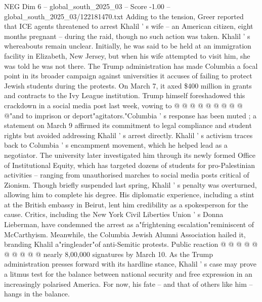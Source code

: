 \begin{textsample}{NEG Dim 6 – global\_south\_2025\_03 – Score -1.00 – global\_south\_2025\_03/122181470.txt}
Adding to the tension, Greer reported that ICE agents threatened to arrest Khalil ' s wife -- an American citizen, eight months pregnant -- during the raid, though no such action was taken.
Khalil ' s whereabouts remain unclear.
Initially, he was said to be held at an immigration facility in Elizabeth, New Jersey, but when his wife attempted to visit him, she was told he was not there.
The Trump administration has made Columbia a focal point in its broader campaign against universities it accuses of failing to protect Jewish students during the protests.
On March 7, it axed \$400 million in grants and contracts to the Ivy League institution.
Trump himself foreshadowed this crackdown in a social media post last week, vowing to @ @ @ @ @ @ @ @ @ @"and to imprison or deport"agitators."Columbia ' s response has been muted ; a statement on March 9 affirmed its commitment to legal compliance and student rights but avoided addressing Khalil ' s arrest directly.
Khalil ' s activism traces back to Columbia ' s encampment movement, which he helped lead as a negotiator.
The university later investigated him through its newly formed Office of Institutional Equity, which has targeted dozens of students for pro-Palestinian activities -- ranging from unauthorised marches to social media posts critical of Zionism.
Though briefly suspended last spring, Khalil ' s penalty was overturned, allowing him to complete his degree.
His diplomatic experience, including a stint at the British embassy in Beirut, lent him credibility as a spokesperson for the cause.
Critics, including the New York Civil Liberties Union ' s Donna Lieberman, have condemned the arrest as a"frightening escalation"reminiscent of McCarthyism.
Meanwhile, the Columbia Jewish Alumni Association hailed it, branding Khalil a"ringleader"of anti-Semitic protests.
Public reaction @ @ @ @ @ @ @ @ @ @ nearly 8,00,000 signatures by March 10.
As the Trump administration presses forward with its hardline stance, Khalil ' s case may prove a litmus test for the balance between national security and free expression in an increasingly polarised America.
For now, his fate -- and that of others like him -- hangs in the balance.

\end{textsample}
